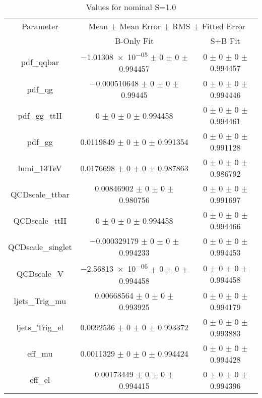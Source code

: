 \begin{table}
\centering
\caption{Values for nominal S=1.0}
\begin{tabular}{ccc}
\toprule
Parameter & \multicolumn{2}{c}{Mean $\pm$ Mean Error $\pm$ RMS $\pm$ Fitted Error}\\
 & B-Only Fit & S+B Fit\\
\midrule
pdf\_qqbar & \num{-1.01308e-05} $\pm$ \num{0} $\pm$ \num{0} $\pm$ \num{0.994457} & \num{0} $\pm$ \num{0} $\pm$ \num{0} $\pm$ \num{0.994457}\\
pdf\_qg & \num{-0.000510648} $\pm$ \num{0} $\pm$ \num{0} $\pm$ \num{0.99445} & \num{0} $\pm$ \num{0} $\pm$ \num{0} $\pm$ \num{0.994446}\\
pdf\_gg\_ttH & \num{0} $\pm$ \num{0} $\pm$ \num{0} $\pm$ \num{0.994458} & \num{0} $\pm$ \num{0} $\pm$ \num{0} $\pm$ \num{0.994461}\\
pdf\_gg & \num{0.0119849} $\pm$ \num{0} $\pm$ \num{0} $\pm$ \num{0.991354} & \num{0} $\pm$ \num{0} $\pm$ \num{0} $\pm$ \num{0.991128}\\
lumi\_13TeV & \num{0.0176698} $\pm$ \num{0} $\pm$ \num{0} $\pm$ \num{0.987863} & \num{0} $\pm$ \num{0} $\pm$ \num{0} $\pm$ \num{0.986792}\\
QCDscale\_ttbar & \num{0.00846902} $\pm$ \num{0} $\pm$ \num{0} $\pm$ \num{0.980756} & \num{0} $\pm$ \num{0} $\pm$ \num{0} $\pm$ \num{0.991697}\\
QCDscale\_ttH & \num{0} $\pm$ \num{0} $\pm$ \num{0} $\pm$ \num{0.994458} & \num{0} $\pm$ \num{0} $\pm$ \num{0} $\pm$ \num{0.994466}\\
QCDscale\_singlet & \num{-0.000329179} $\pm$ \num{0} $\pm$ \num{0} $\pm$ \num{0.994233} & \num{0} $\pm$ \num{0} $\pm$ \num{0} $\pm$ \num{0.994453}\\
QCDscale\_V & \num{-2.56813e-06} $\pm$ \num{0} $\pm$ \num{0} $\pm$ \num{0.994458} & \num{0} $\pm$ \num{0} $\pm$ \num{0} $\pm$ \num{0.994458}\\
ljets\_Trig\_mu & \num{0.00668564} $\pm$ \num{0} $\pm$ \num{0} $\pm$ \num{0.993925} & \num{0} $\pm$ \num{0} $\pm$ \num{0} $\pm$ \num{0.994179}\\
ljets\_Trig\_el & \num{0.0092536} $\pm$ \num{0} $\pm$ \num{0} $\pm$ \num{0.993372} & \num{0} $\pm$ \num{0} $\pm$ \num{0} $\pm$ \num{0.993883}\\
eff\_mu & \num{0.0011329} $\pm$ \num{0} $\pm$ \num{0} $\pm$ \num{0.994424} & \num{0} $\pm$ \num{0} $\pm$ \num{0} $\pm$ \num{0.994428}\\
eff\_el & \num{0.00173449} $\pm$ \num{0} $\pm$ \num{0} $\pm$ \num{0.994415} & \num{0} $\pm$ \num{0} $\pm$ \num{0} $\pm$ \num{0.994396}\\

\end{tabular}
\end{table}
